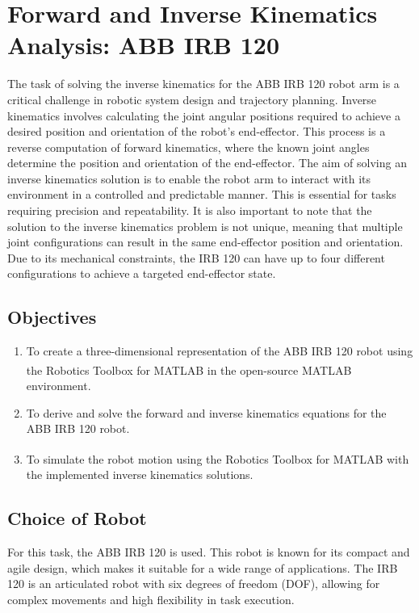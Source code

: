 \newpage
\section{Forward and Inverse Kinematics Analysis: ABB IRB 120}
The task of solving the inverse kinematics for the ABB IRB 120 robot arm is a critical challenge in robotic system design and trajectory planning. Inverse kinematics involves calculating the joint angular positions required to achieve a desired position and orientation of the robot's end-effector. This process is a reverse computation of forward kinematics, where the known joint angles determine the position and orientation of the end-effector. The aim of solving an inverse kinematics solution is to enable the robot arm to interact with its environment in a controlled and predictable manner. This is essential for tasks requiring precision and repeatability. It is also important to note that the solution to the inverse kinematics problem is not unique, meaning that multiple joint configurations can result in the same end-effector position and orientation. Due to its mechanical constraints, the IRB 120 can have up to four different configurations to achieve a targeted end-effector state.

\subsection{Objectives}
\begin{enumerate}
  \item To create a three-dimensional representation of the ABB IRB 120 robot using the Robotics Toolbox for MATLAB\textsuperscript{\textregistered} in the open-source MATLAB\textsuperscript{\textregistered} environment.

  \item To derive and solve the forward and inverse kinematics equations for the ABB IRB 120 robot.

  \item To simulate the robot motion using the Robotics Toolbox for MATLAB\textsuperscript{\textregistered} with the implemented inverse kinematics solutions.
\end{enumerate}

\subsection{Choice of Robot}
For this task, the ABB IRB 120 is used. This robot is known for its compact and agile design, which makes it suitable for a wide range of applications. The IRB 120 is an articulated robot with six degrees of freedom (DOF), allowing for complex movements and high flexibility in task execution.

